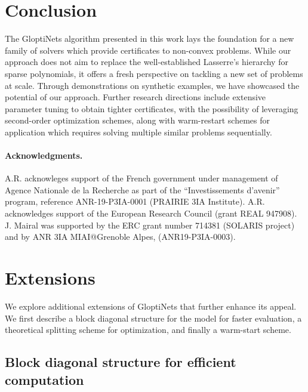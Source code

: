 \documentclass{article}
\begin{document}
\section{Conclusion}

The GloptiNets algorithm presented in this work lays the foundation for a new family of solvers which provide certificates to non-convex problems. While our approach does not aim to replace the well-established Lasserre's hierarchy for sparse polynomials, it offers a fresh perspective on tackling a new set of problems at scale. Through demonstrations on synthetic examples, we have showcased the potential of our approach. Further research directions include extensive parameter tuning to obtain tighter certificates, with the possibility of leveraging second-order optimization schemes, along with warm-restart schemes for application which requires solving multiple similar problems sequentially.

\newpage

\paragraph{Acknowledgments.}{
  A.R. acknowleges support of the French government under management of Agence Nationale de la Recherche as part of the ``Investissements d'avenir'' program, reference ANR-19-P3IA-0001 (PRAIRIE 3IA Institute). A.R. acknowledges support of the European Research Council (grant REAL 947908).  J. Mairal was supported by the ERC grant number 714381 (SOLARIS project) and by ANR 3IA MIAI@Grenoble Alpes, (ANR19-P3IA-0003).
}




\newpage

\appendix


\section{Extensions}
\label{sec:extensions}

We explore additional extensions of GloptiNets that further enhance its appeal. We first describe a block diagonal structure for the model for faster evaluation, a theoretical splitting scheme for optimization, and finally a warm-start scheme.

\subsection{Block diagonal structure for efficient computation}
\end{document}

